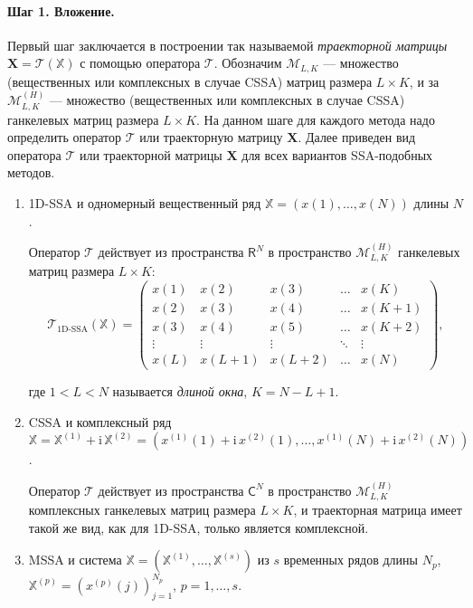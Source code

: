 \documentclass[specialist,
               substylefile = spbu.rtx,
               subf,href,colorlinks=true, 12pt]{disser}
\newcommand{\I}{\mathrm{i}}
\begin{document}
\paragraph{Шаг 1. Вложение.} Первый шаг заключается в построении так называемой \textit{траекторной матрицы} $\mathbf{X} = \mathcal{T}\left(\mathbb{X} \right)$ с помощью оператора $\mathcal{T}$.
Обозначим $\mathcal{M}_{L,K}$ --- множество (вещественных или комплексных в случае CSSA) матриц размера $L \times K$, и за $\mathcal{M}_{L,K}^{(H)}$ --- множество (вещественных или комплексных в случае CSSA) ганкелевых матриц размера $L \times K$.
На данном шаге для каждого метода надо определить оператор $\mathcal{T}$ или траекторную матрицу $\mathbf{X}$.
Далее приведен  вид  оператора $\mathcal{T}$ или траекторной матрицы $\mathbf{X}$ для всех вариантов SSA-подобных методов.
\begin{enumerate}
\item 1D-SSA и одномерный вещественный ряд $\mathbb{X}= (x(1),\ldots,x(N))$ длины $N$.

Оператор $\mathcal{T}$ действует из пространства $\mathsf{R}^N$ в пространство $\mathcal{M}_{L,K}^{(H)}$ ганкелевых матриц размера $L \times K$:
\begin{equation*}
\mathcal{T}_{\text{1D-SSA}}(\mathbb{X}) = \begin{pmatrix}
			x(1) & x(2) & x(3) & \ldots & x({K}) \\
			x(2) & x(3) & x(4) & \ldots & x({K+1}) \\
			x(3) & x(4) & x(5) & \ldots & x({K+2}) \\
			\vdots &\vdots & \vdots & \ddots & \vdots \\
			x({L}) & x({L+1}) & x({L+2}) & \ldots & x({N})
			\end{pmatrix},
\end{equation*}

где $1<L<N$ называется \textit{длиной окна}, $K=N-L+1$.
\item CSSA и комплексный ряд $\mathbb{X}=\mathbb{X}^{(1)} + \I \,\mathbb{X}^{(2)}= \left(x^{(1)}(1) + \I\,x^{(2)}(1) ,\ldots,x^{(1)}(N) + \I\,x^{(2)}(N)\right)$.

Оператор $\mathcal{T}$ действует из пространства $\mathsf{C}^N$ в пространство $\mathcal{M}_{L,K}^{(H)}$ комплексных ганкелевых матриц размера $L \times K$, и траекторная матрица имеет такой же вид, как для 1D-SSA, только является комплексной.

\item MSSA и система $\mathbb{X}=\left(\mathbb{X}^{(1)},
 \ldots,\mathbb{X}^{(s)}\right)$ из $s$ временных рядов длины $N_p$, $\mathbb{X}^{(p)} = \left( x^{(p)}(j) \right)_{j=1}^{N_p}$, $p=1,\ldots,s$.


\end{enumerate}
\end{document}
